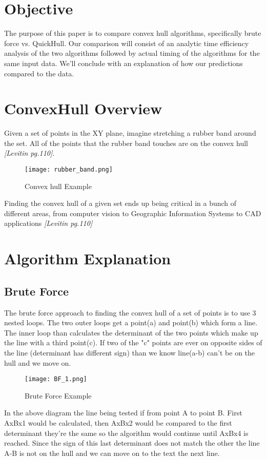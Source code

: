 \documentclass[a4paper, 12pt]{article}
\begin{document}

\tableofcontents{}
\vspace{10cm}
{
  \section{Objective}
The purpose of this paper is to compare convex hull algorithms, specifically brute force vs. QuickHull.  Our comparison will consist of an analytic time efficiency analysis of the two algorithms followed by actual timing of the algorithms for the same input data. We'll conclude with an explanation of how our predictions compared to the data.   
  \section{ConvexHull Overview}
  Given a set of points in the XY plane, imagine stretching a rubber band around the set. All of the points that the rubber band touches are on the convex hull \textit{[Levitin pg.110]}.  
  \begin{figure}[H]
    \begin{center}
    \texttt{[image: rubber\_band.png]}
  \end{center}
    \caption{Convex hull Example}
    \label{fig:rubber_band}
  \end{figure} 
  Finding the convex hull of a given set ends up being critical in a bunch of different areas, from computer vision to Geographic Information Systems to CAD applications \textit{[Levitin pg.110]}
  \section{Algorithm Explanation}
  \subsection{Brute Force}
The brute force approach to finding the convex hull of a set of points is to use 3 nested loops.  The two outer loops get a point(a) and point(b) which form a line.  The inner loop than calculates the determinant of the two points which make up the line with a third point(c).  If two of the "c" points are ever on opposite sides of the line (determinant has different sign) than we know line(a-b) can't be on the hull and we move on.   
  \begin{figure}[H]
  \begin{center}
    \texttt{[image: BF\_1.png]}
\end{center}
\caption{Brute Force Example}
    \label{fig:bf_1}
  \end{figure} 
In the above diagram the line being tested if from point A to point B. First AxBx1 would be calculated, then AxBx2 would be compared to the first determinant they're the same so the algorithm would continue until AxBx4 is reached. Since the sign of this last determinant does not match the other the line A-B is not on the hull and we can move on to the text the next line.
}
\end{document}

